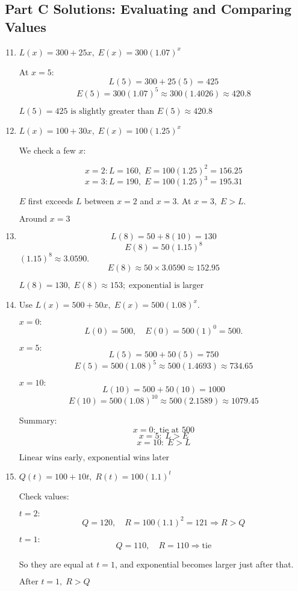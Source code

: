 \documentclass[12pt]{article}
\begin{document}
\subsection*{Part C Solutions: Evaluating and Comparing Values}
\begin{enumerate}
  \setcounter{enumi}{10}
  \item \(L(x) = 300 + 25x,\; E(x) = 300(1.07)^x\)

  At \(x = 5\):
  \[
  L(5) = 300 + 25(5) = 425
  \]
  \[
  E(5) = 300(1.07)^5 \approx 300(1.4026) \approx 420.8
  \]

  \(\boxed{L(5)=425 \text{ is slightly greater than } E(5)\approx 420.8}\)

  \item \(L(x) = 100 + 30x,\; E(x) = 100(1.25)^x\)

  We check a few \(x\):

  \[
  x=2: L=160,\; E=100(1.25)^2=156.25
  \]
  \[
  x=3: L=190,\; E=100(1.25)^3=195.31
  \]

  \(E\) first exceeds \(L\) between \(x=2\) and \(x=3\). At \(x=3,\; E > L.\)

  \(\boxed{\text{Around } x=3}\)

  \item
  \[
  L(8) = 50 + 8(10) = 130
  \]
  \[
  E(8) = 50(1.15)^8
  \]
  \((1.15)^8 \approx 3.0590.\)
  \[
  E(8) \approx 50 \times 3.0590 \approx 152.95
  \]

  \(\boxed{L(8)=130,\; E(8)\approx 153;\; \text{exponential is larger}}\)

  \item Use \(L(x)=500+50x,\; E(x)=500(1.08)^x\).

  \(x=0:\)
  \[
  L(0)=500,\quad E(0)=500(1)^0=500.
  \]

  \(x=5:\)
  \[
  L(5)=500+50(5)=750
  \]
  \[
  E(5)=500(1.08)^5 \approx 500(1.4693)\approx 734.65
  \]

  \(x=10:\)
  \[
  L(10)=500+50(10)=1000
  \]
  \[
  E(10)=500(1.08)^{10} \approx 500(2.1589)\approx 1079.45
  \]

  Summary:
  \[
  x=0:\; \text{tie at 500}
  \]
  \[
  x=5:\; L > E
  \]
  \[
  x=10:\; E > L
  \]

  \(\boxed{\text{Linear wins early, exponential wins later}}\)

  \item \(Q(t) = 100 + 10t,\; R(t) = 100(1.1)^t\)

  Check values:

  \(t=2:\)
  \[
  Q=120,\quad R=100(1.1)^2=121
  \Rightarrow R>Q
  \]

  \(t=1:\)
  \[
  Q=110,\quad R=110
  \Rightarrow \text{tie}
  \]

  So they are equal at \(t=1\), and exponential becomes larger just after that.

  \(\boxed{\text{After } t=1,\; R>Q}\)
\end{enumerate}
\end{document}
